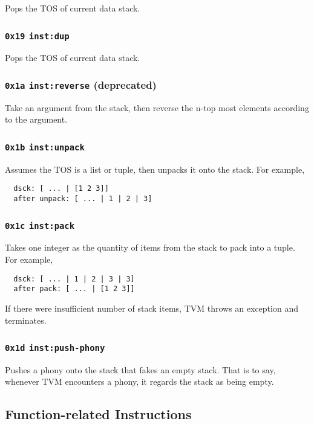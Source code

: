 \documentclass{article}
\newcommand{\inst}[1] {\texttt{inst:#1}}
\begin{document}
Pops the TOS of current data stack.

\subsubsection{\texttt{0x19} \inst{dup}}

Pops the TOS of current data stack.

\subsubsection{\texttt{0x1a} \inst{reverse} (deprecated)}

Take an argument from the stack, then reverse the n-top most elements according to the argument.

\subsubsection{\texttt{0x1b} \inst{unpack}}

Assumes the TOS is a list or tuple, then unpacks it onto the stack. For example,
\begin{verbatim}
  dsck: [ ... | [1 2 3]]
  after unpack: [ ... | 1 | 2 | 3]
\end{verbatim}

\subsubsection{\texttt{0x1c} \inst{pack}}

Takes one integer as the quantity of items from the stack to pack into a tuple. For example,
\begin{verbatim}
  dsck: [ ... | 1 | 2 | 3 | 3]
  after pack: [ ... | [1 2 3]]
\end{verbatim}

If there were insufficient number of stack items, TVM throws an exception and terminates.

\subsubsection{\texttt{0x1d} \inst{push-phony}}

Pushes a phony onto the stack that fakes an empty stack. That is to say, whenever TVM encounters a phony, it regards the stack as being empty.

\subsection{Function-related Instructions}
\end{document}
